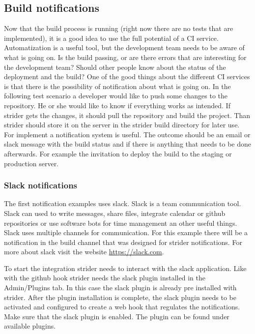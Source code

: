 \subsection{Build notifications}
\label{section:Build Notifications}
Now that the build process is running (right now there are no tests that are implemented), it is a
good idea to use the full potential of a CI service. Automatization is a useful tool, but the development team needs to be aware of
what is going on. Is the build passing, or are there errors that are interesting for the development team? Should other people
know about the status of the deployment and the build? One of the good things about the different CI services is that there is the
possibility of notification about what is going on. In the following test scenario a developer would like to push some changes to the repository.
He or she would like to know if everything works as intended. If strider gets the changes, it should pull the repository and build the
project. Than strider should store it on the server in the strider build directory for later use. For implement a notification system is useful.
The outcome should be an email or slack message with the build status and if there is anything that needs to be done afterwards. For example
the invitation to deploy the build to the staging or production server.

\subsubsection{Slack notifications}
The first notification examples uses slack. Slack is a team communication tool. Slack can used to write messages, share files, integrate calendar or
github repositories or use software bots for time management an other useful things. Slack uses multiple channels for communication. For this example there
will be a notification in the build channel that was designed for strider notifications. For more about slack visit the website \url{https://slack.com}.

To start the integration strider needs to interact with the slack application. Like with the github hook strider needs the slack
plugin installed in the Admin/Plugins tab. In this case the slack plugin is already pre installed with strider. After the plugin installation
is complete, the slack plugin needs to be activated and configured to create a web hook that regulates the notifications.
Make sure that the slack plugin is enabled. The plugin can be found under available plugins.

